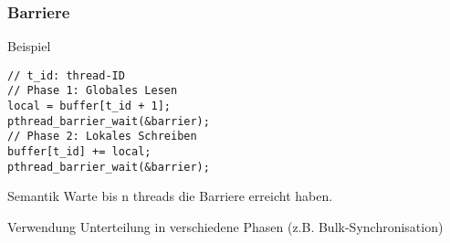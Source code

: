 \documentclass[xcolor=pdftex,dvipsnames,table]{beamer}
\begin{document}
\begin{frame}[fragile]
	\frametitle{Barriere}
	\begin{block}{Beispiel}
		\begin{lstlisting}
// t_id: thread-ID	
// Phase 1: Globales Lesen
local = buffer[t_id + 1];
pthread_barrier_wait(&barrier);
// Phase 2: Lokales Schreiben
buffer[t_id] += local;
pthread_barrier_wait(&barrier);
		\end{lstlisting}
	\end{block}
	
	\begin{block}{Semantik}
		Warte bis n threads die Barriere erreicht haben.
	\end{block}	
	
	\begin{block}{Verwendung}
		Unterteilung in verschiedene Phasen (z.B. Bulk-Synchronisation)
	\end{block}	
\end{frame}
\end{document}
